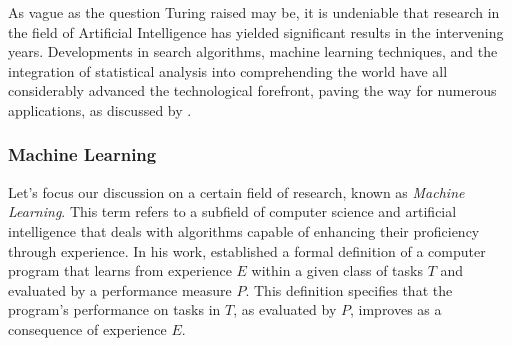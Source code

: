 \documentclass{article}
\begin{document}
\medskip
\noindent
As vague as the question Turing raised may be, it is undeniable that research in the field of Artificial Intelligence has yielded significant results in the intervening years. Developments in search algorithms, machine learning techniques, and the integration of statistical analysis into comprehending the world have all considerably advanced the technological forefront, paving the way for numerous applications, as discussed by \citet{borana2016applications}.

\subsubsection{Machine Learning}
\label{subsec:ml}

Let's focus our discussion on a certain field of research, known as \emph{Machine Learning}. This term refers to a subfield of computer science and artificial intelligence that deals with algorithms capable of enhancing their proficiency through experience. In his work, \citet{mitchell1997machine} established a formal definition of a computer program that learns from experience $E$ within a given class of tasks $T$ and evaluated by a performance measure $P$. This definition specifies that the program's performance on tasks in $T$, as evaluated by $P$, improves as a consequence of experience $E$.
\end{document}
